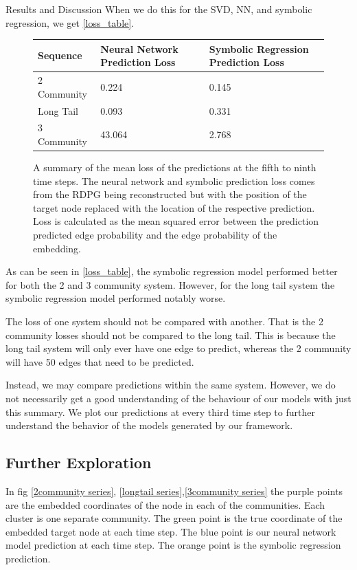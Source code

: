 \documentclass[12pt]{amsart}
\begin{document}
\begin{section}{Results and Discussion}
        When we do this for the SVD, NN, and symbolic regression, we get \autoref{loss_table}.
        \begin{figure}
            \begin{center}
                \begin{tabular}{| m{} | m{} | m{} |}
                    \hline
                    Sequence & Neural Network Prediction Loss & Symbolic Regression Prediction Loss\\ 
                    \hline
                    \hline
                    2 Community & 0.224 & 0.145 \\ 
                    \hline 
                    Long Tail  & 0.093 & 0.331 \\ 
                    \hline 
                    3 Community & 43.064 & 2.768 \\ 
                    \hline 
                \end{tabular}
                \end{center}
                \caption{A summary of the mean loss of the predictions at the fifth to ninth time steps. The neural network and symbolic prediction loss comes from the RDPG being reconstructed but with the position of the target node replaced with the location of the respective prediction. Loss is calculated as the mean squared error between the prediction predicted edge probability and the edge probability of the embedding.}
                \label{loss_table}
        \end{figure}

        As can be seen in \autoref{loss_table}, the symbolic regression model performed better for both the 2 and 3 community system. However, for the long tail system the symbolic regression model performed notably worse. 

        The loss of one system should not be compared with another. That is the 2 community losses should not be compared to the long tail. This is because the long tail system will only ever have one edge to predict, whereas the 2 community will have 50 edges that need to be predicted.

        Instead, we may compare predictions within the same system. However, we do not necessarily get a good understanding of the behaviour of our models with just this summary. We plot our predictions at every third time step to further understand the behavior of the models generated by our framework.

    \subsection{Further Exploration}
        In fig \autoref{2community series}, \autoref{longtail series},\autoref{3community series} the purple points are the embedded coordinates of the node in each of the communities. Each cluster is one separate community. The green point is the true coordinate of the embedded target node at each time step. The blue point is our neural network model prediction at each time step. The orange point is the symbolic regression prediction. 
        

\end{section}
\end{document}
